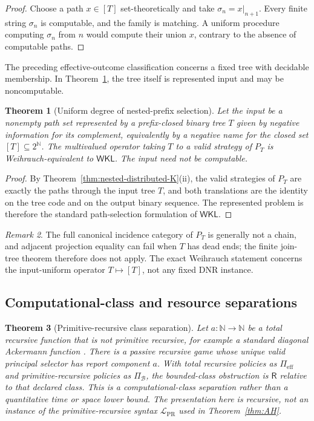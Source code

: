 \documentclass[11pt]{article}
\theoremstyle{plain}
\newtheorem{theorem}{Theorem}[section]
\theoremstyle{definition}
\theoremstyle{remark}
\newtheorem{remark}[theorem]{Remark}
\newcommand{\N}{\mathbb{N}}
\begin{document}
\begin{proof}
Choose a path $x\in[T]$ set-theoretically and take
$\sigma_n=x|_{n+1}$. Every finite string $\sigma_n$ is computable, and the
family is matching. A uniform procedure computing $\sigma_n$ from $n$ would
compute their union $x$, contrary to the absence of computable paths.
\end{proof}

The preceding effective-outcome classification concerns a fixed tree with
decidable membership. In Theorem~\ref{thm:nested-WKL}, the tree itself is
represented input and may be noncomputable.

\begin{theorem}[Uniform degree of nested-prefix selection]
\label{thm:nested-WKL}
Let the input be a nonempty path set represented by a prefix-closed binary tree
$T$ given by negative information for its complement, equivalently by a negative
name for the closed set $[T]\subseteq2^\N$. The multivalued operator taking $T$
to a valid strategy of $P_T$ is Weihrauch-equivalent to $\mathsf{WKL}$. The
input need not be computable.
\end{theorem}

\begin{proof}
By Theorem~\ref{thm:nested-distributed-K}(ii), the valid strategies of $P_T$ are
exactly the paths through the input tree $T$, and both translations are the
identity on the tree code and on the output binary sequence. The represented
problem is therefore the standard path-selection formulation of
$\mathsf{WKL}$.
\end{proof}

\begin{remark}
The full canonical incidence category of $P_T$ is generally not a chain, and adjacent
projection equality can fail when $T$ has dead ends; the finite join-tree
theorem therefore does not apply. The exact Weihrauch statement concerns the input-uniform
operator $T\mapsto[T]$, not any fixed DNR instance.
\end{remark}


\subsection{Computational-class and resource separations}

\begin{theorem}[Primitive-recursive class separation]\label{thm:primitive-class-separation}
Let $a:\N\to\N$ be a total recursive function that is not primitive recursive,
for example a standard diagonal Ackermann function \cite{rogers}. There is a
passive recursive
game whose unique valid principal selector has report component $a$. With total recursive policies as
$\Pi_{\mathrm{eff}}$ and primitive-recursive policies as $\Pi_{\mathcal B}$,
the bounded-class obstruction is $\mathsf R$ relative to that declared class.
This is a computational-class separation rather than a quantitative time or
space lower bound. The presentation here is recursive, not an instance of the
primitive-recursive syntax $\mathcal L_{\mathrm{PR}}$ used in
Theorem~\ref{thm:AH}.
\end{theorem}
\end{document}
